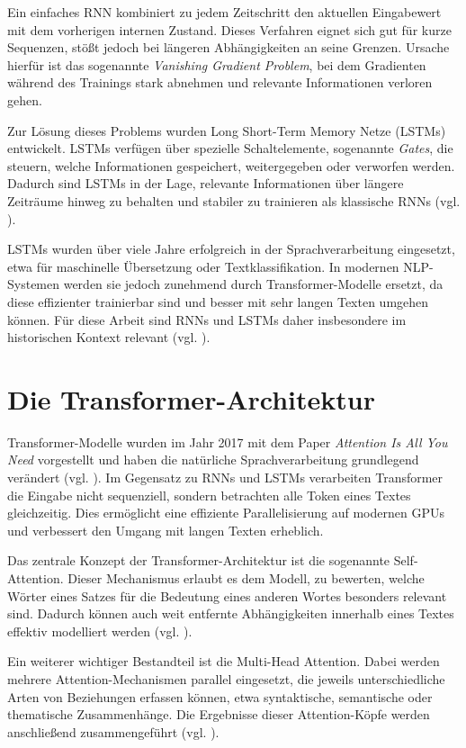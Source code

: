 Ein einfaches RNN kombiniert zu jedem Zeitschritt den aktuellen Eingabewert mit dem vorherigen internen Zustand. Dieses Verfahren eignet sich gut für kurze Sequenzen, stößt jedoch bei längeren Abhängigkeiten an seine Grenzen. Ursache hierfür ist das sogenannte \textit{Vanishing Gradient Problem}, bei dem Gradienten während des Trainings stark abnehmen und relevante Informationen verloren gehen.

Zur Lösung dieses Problems wurden Long Short-Term Memory Netze (LSTMs) entwickelt. LSTMs verfügen über spezielle Schaltelemente, sogenannte \textit{Gates}, die steuern, welche Informationen gespeichert, weitergegeben oder verworfen werden. Dadurch sind LSTMs in der Lage, relevante Informationen über längere Zeiträume hinweg zu behalten und stabiler zu trainieren als klassische RNNs (vgl. \cite{hochreiter1997long}).

LSTMs wurden über viele Jahre erfolgreich in der Sprachverarbeitung eingesetzt, etwa für maschinelle Übersetzung oder Textklassifikation. In modernen NLP-Systemen werden sie jedoch zunehmend durch Transformer-Modelle ersetzt, da diese effizienter trainierbar sind und besser mit sehr langen Texten umgehen können. Für diese Arbeit sind RNNs und LSTMs daher insbesondere im historischen Kontext relevant (vgl. \cite{hochreiter1997long}).

\section{Die Transformer-Architektur}

Transformer-Modelle wurden im Jahr 2017 mit dem Paper \textit{Attention Is All You Need} vorgestellt und haben die natürliche Sprachverarbeitung grundlegend verändert (vgl. \cite{Attention-Is-All-You-Need}). Im Gegensatz zu RNNs und LSTMs verarbeiten Transformer die Eingabe nicht sequenziell, sondern betrachten alle Token eines Textes gleichzeitig. Dies ermöglicht eine effiziente Parallelisierung auf modernen GPUs und verbessert den Umgang mit langen Texten erheblich.

Das zentrale Konzept der Transformer-Architektur ist die sogenannte Self-Attention. Dieser Mechanismus erlaubt es dem Modell, zu bewerten, welche Wörter eines Satzes für die Bedeutung eines anderen Wortes besonders relevant sind. Dadurch können auch weit entfernte Abhängigkeiten innerhalb eines Textes effektiv modelliert werden (vgl. \cite{Attention-Is-All-You-Need}).

Ein weiterer wichtiger Bestandteil ist die Multi-Head Attention. Dabei werden mehrere Attention-Mechanismen parallel eingesetzt, die jeweils unterschiedliche Arten von Beziehungen erfassen können, etwa syntaktische, semantische oder thematische Zusammenhänge. Die Ergebnisse dieser Attention-Köpfe werden anschließend zusammengeführt (vgl. \cite{Attention-Is-All-You-Need}).

